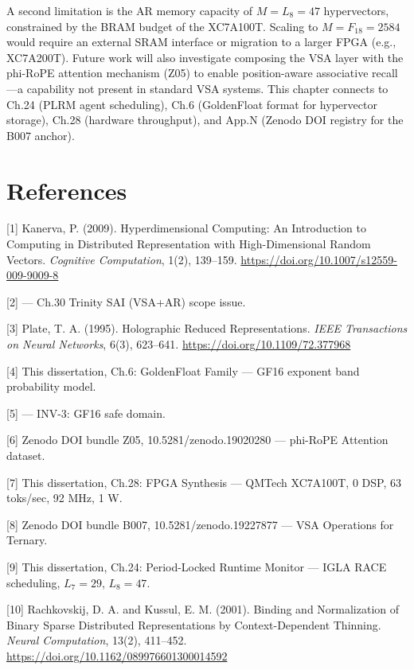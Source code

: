 A second limitation is the AR memory capacity of
\(M = L_8 = 47\) hypervectors, constrained by the
BRAM budget of the XC7A100T. Scaling to
\(M = F_{18} = 2584\) would require an external
SRAM interface or migration to a larger FPGA
(e.g., XC7A200T). Future work will also
investigate composing the VSA layer with the
phi-RoPE attention mechanism (Z05) to enable
position-aware associative recall---a capability
not present in standard VSA systems. This chapter
connects to Ch.24 (PLRM agent scheduling), Ch.6
(GoldenFloat format for hypervector storage),
Ch.28 (hardware throughput), and App.N (Zenodo DOI
registry for the B007 anchor).

\section{References}\label{fa_30:references}

[1] Kanerva, P. (2009). Hyperdimensional
Computing: An Introduction to Computing in
Distributed Representation with High-Dimensional
Random Vectors. \emph{Cognitive Computation},
1(2), 139--159.
\url{https://doi.org/10.1007/s12559-009-9009-8}

[2]  --- Ch.30
Trinity SAI (VSA+AR) scope issue.

[3] Plate, T. A. (1995). Holographic Reduced
Representations. \emph{IEEE Transactions on Neural
Networks}, 6(3), 623--641.
\url{https://doi.org/10.1109/72.377968}

[4] This dissertation, Ch.6: GoldenFloat
Family --- GF16 exponent band probability model.

[5]
--- INV-3: GF16 safe domain.

[6] Zenodo DOI bundle Z05,
10.5281/zenodo.19020280 --- phi-RoPE Attention
dataset.

[7] This dissertation, Ch.28: FPGA Synthesis
--- QMTech XC7A100T, 0 DSP, 63 toks/sec, 92 MHz, 1
W.

[8] Zenodo DOI bundle B007,
10.5281/zenodo.19227877 --- VSA Operations for
Ternary.

[9] This dissertation, Ch.24: Period-Locked
Runtime Monitor --- IGLA RACE scheduling,
\(L_7=29\), \(L_8=47\).

[10] Rachkovskij, D. A. and Kussul, E. M.
(2001). Binding and Normalization of Binary Sparse
Distributed Representations by Context-Dependent
Thinning. \emph{Neural Computation}, 13(2),
411--452.
\url{https://doi.org/10.1162/089976601300014592}

